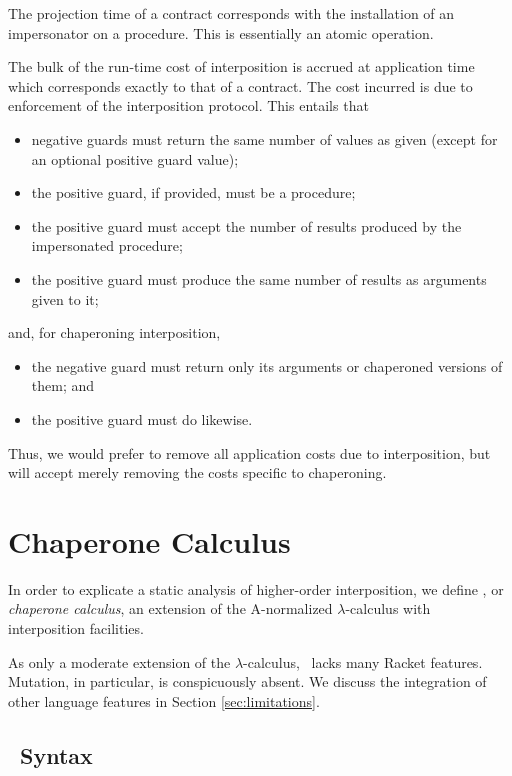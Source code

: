 \documentclass{sigplanconf}
\begin{document}
The projection time of a contract corresponds with the installation of an impersonator on a procedure.
This is essentially an atomic operation.

The bulk of the run-time cost of interposition is accrued at application time which corresponds exactly to that of a contract.
The cost incurred is due to enforcement of the interposition protocol.
This entails that
\begin{itemize}
\item negative guards must return the same number of values as given (except for an optional positive guard value);
\item the positive guard, if provided, must be a procedure;
\item the positive guard must accept the number of results produced by the impersonated procedure;
\item the positive guard must produce the same number of results as arguments given to it;
\end{itemize}
and, for chaperoning interposition,
\begin{itemize}
\item the negative guard must return only its arguments or chaperoned versions of them; and
\item the positive guard must do likewise.
\end{itemize}

Thus, we would prefer to remove all application costs due to interposition, but will accept merely removing the costs specific to chaperoning.

\section{Chaperone Calculus}

In order to explicate a static analysis of higher-order interposition, we define \chapcalc, or \emph{chaperone calculus}, an extension of the A-normalized $\lambda$-calculus with interposition facilities.

As only a moderate extension of the $\lambda$-calculus, \chapcalc\ lacks many Racket features.
Mutation, in particular, is conspicuously absent.
We discuss the integration of other language features in Section \ref{sec:limitations}.


\subsection{\chapcalc\ Syntax}
\end{document}
